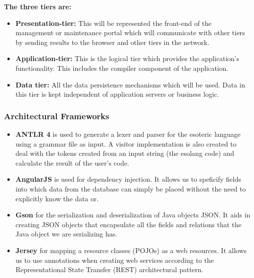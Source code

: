 \documentclass[english]{article}
\begin{document}
		\vspace{0.5cm}		
		
		\textbf{The three tiers are:}
			\begin{itemize}
			\item \textbf{Presentation-tier:} This will be represented the front-end of the management or maintenance portal which will communicate with other tiers by sending results to the browser and other tiers in the network.
			\item \textbf{Application-tier:} This is the logical tier which provides the application's functionality. This includes the compiler component of the application.	
			\item \textbf{Data tier:} All the data persistence mechanisms which will be used. Data in this tier is kept independent of application servers or business logic. 	
			\end{itemize}	
			
			\vspace{0.5cm}
			
		\fi

	\newpage
	\subsubsection{Architectural Frameworks} %

	\begin{itemize}
		
		
		\item \textbf{ANTLR 4} is used to generate a lexer and parser for the esoteric language using a grammar file as input. A visitor implementation is also created to deal with the tokens created from an input string (the esolang code) and calculate the result of the user's code.
	
	\item \textbf{AngularJS} is used for dependency injection. It allows us to speficify fields into which data from the database can simply be placed without the need to explicitly know the data or.
	
	\item \textbf{Gson} for the serialization and deserialization of Java objects JSON. It aids in creating JSON objects that encapsulate all the fields and relations that the Java object we are serializing has.
	\item \textbf{Jersey} for mapping a resource classes (POJOs) as a web resources. It allows us to use annotations  when creating web services according to the Representational State Transfer (REST) architectural pattern.
		\end{itemize}	
\end{document}
